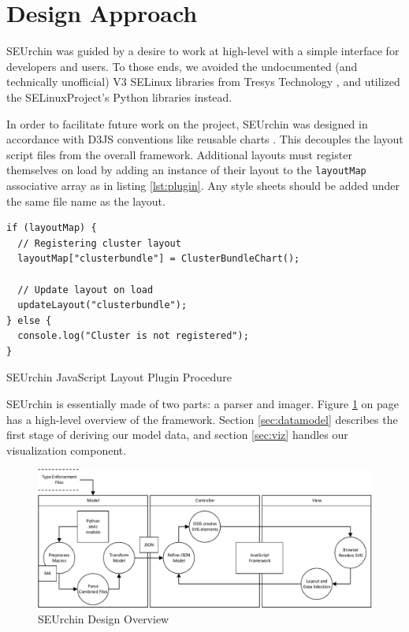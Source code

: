 \documentclass[conference]{IEEEtran}
\begin{document}
\section{Design Approach}\label{sec:design}
SEUrchin was guided by a desire to work at high-level with a simple interface for developers and users. To those ends, we avoided the undocumented (and technically unofficial) V3 SELinux libraries from Tresys Technology \cite{tresystools}, and utilized the SELinuxProject's Python libraries\cite{selinuxproject} instead.

In order to facilitate future work on the project, SEUrchin was designed in accordance with D3JS conventions like reusable charts \cite{reusechart,castillo2014mastering}. This decouples the layout script files from the overall framework. Additional layouts must register themselves on load by adding an instance of their layout to the \texttt{layoutMap} associative array as in listing \ref{lst:plugin}. Any style sheets should be added under the same file name as the layout.

\begin{listing}
\begin{verbatim}
if (layoutMap) {
  // Registering cluster layout
  layoutMap["clusterbundle"] = ClusterBundleChart();

  // Update layout on load
  updateLayout("clusterbundle");
} else {
  console.log("Cluster is not registered");
}
\end{verbatim}
\caption{SEUrchin JavaScript Layout Plugin Procedure}
\label{lst:plugin}
\end{listing}

SEUrchin is essentially made of two parts: a parser and imager. Figure \ref{fig:seurchinoverview} on page \pageref{fig:seurchinoverview} has a high-level overview of the framework. Section \ref{sec:datamodel} describes the first stage of deriving our model data, and section \ref{sec:viz} handles our visualization component.

\begin{figure}
\includegraphics[max width={\textwidth}]{overview.pdf}
\caption{SEUrchin Design Overview}
\label{fig:seurchinoverview}
\end{figure}
\end{document}
